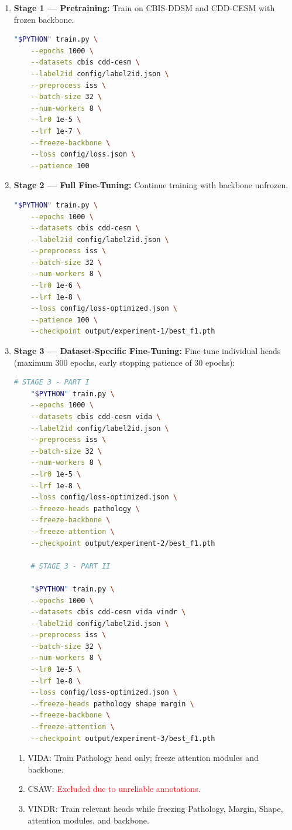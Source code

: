 \documentclass[11pt,a4paper]{article}
\begin{document}
\begin{enumerate}
    \item \textbf{Stage 1 — Pretraining:} Train on CBIS-DDSM and CDD-CESM with frozen backbone. \\
    \begin{lstlisting}[language=bash, caption=Training Command based on Original Scripts]
    "$PYTHON" train.py \
    --epochs 1000 \
    --datasets cbis cdd-cesm \
    --label2id config/label2id.json \
    --preprocess iss \
    --batch-size 32 \
    --num-workers 8 \
    --lr0 1e-5 \
    --lrf 1e-7 \
    --freeze-backbone \
    --loss config/loss.json \
    --patience 100
    \end{lstlisting}
    \item \textbf{Stage 2 — Full Fine-Tuning:} Continue training with backbone unfrozen.
    \begin{lstlisting}[language=bash, caption=Training Command based on Original Scripts]
    "$PYTHON" train.py \
    --epochs 1000 \
    --datasets cbis cdd-cesm \
    --label2id config/label2id.json \
    --preprocess iss \
    --batch-size 32 \
    --num-workers 8 \
    --lr0 1e-6 \
    --lrf 1e-8 \
    --loss config/loss-optimized.json \
    --patience 100 \
    --checkpoint output/experiment-1/best_f1.pth
    \end{lstlisting}
    \item \textbf{Stage 3 — Dataset-Specific Fine-Tuning:} Fine-tune individual heads (maximum 300 epochs, early stopping patience of 30 epochs):
    \begin{lstlisting}[language=bash, caption=Training Command based on Original Scripts]
    # STAGE 3 - PART I
    "$PYTHON" train.py \
    --epochs 1000 \
    --datasets cbis cdd-cesm vida \
    --label2id config/label2id.json \
    --preprocess iss \
    --batch-size 32 \
    --num-workers 8 \
    --lr0 1e-5 \
    --lrf 1e-8 \
    --loss config/loss-optimized.json \
    --freeze-heads pathology \
    --freeze-backbone \
    --freeze-attention \
    --checkpoint output/experiment-2/best_f1.pth

    # STAGE 3 - PART II

    "$PYTHON" train.py \
    --epochs 1000 \
    --datasets cbis cdd-cesm vida vindr \
    --label2id config/label2id.json \
    --preprocess iss \
    --batch-size 32 \
    --num-workers 8 \
    --lr0 1e-5 \
    --lrf 1e-8 \
    --loss config/loss-optimized.json \
    --freeze-heads pathology shape margin \
    --freeze-backbone \
    --freeze-attention \
    --checkpoint output/experiment-3/best_f1.pth
    \end{lstlisting}
    \begin{enumerate}
    \item VIDA: Train Pathology head only; freeze attention modules and backbone.
    \item CSAW: \textcolor{red}{Excluded due to unreliable annotations.}
    \item VINDR: Train relevant heads while freezing Pathology, Margin, Shape, attention modules, and backbone.
    \end{enumerate}
\end{enumerate}
\end{document}
